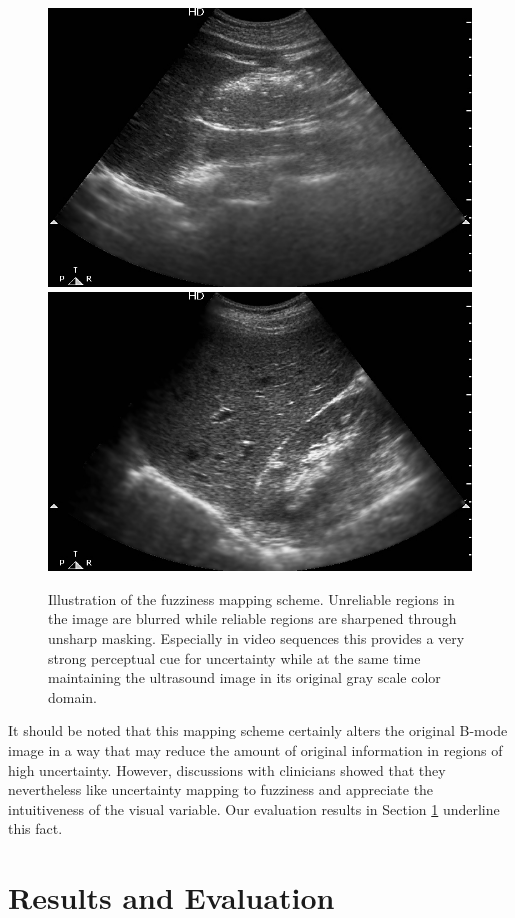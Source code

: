 \begin{figure}[ht]
	\centering
	\includegraphics[width=0.42\linewidth]{figures/cmvis/fuzzy-100.jpg}
	\qquad
	\includegraphics[width=0.42\linewidth]{figures/cmvis/fuzzy-300.jpg}
	\caption{
		Illustration of the fuzziness mapping scheme.
		Unreliable regions in the image are blurred while reliable regions are sharpened through unsharp masking.
		Especially in video sequences this provides a very strong perceptual cue for uncertainty while at the same time maintaining the ultrasound image in its original gray scale color domain.
	}
	\label{fig:cmvis:vis-fuzziness}
\end{figure}

It should be noted that this mapping scheme certainly alters the original B-mode image in a way that may reduce the amount of original information in regions of high uncertainty.
However, discussions with clinicians showed that they nevertheless like uncertainty mapping to fuzziness and appreciate the intuitiveness of the visual variable.
Our evaluation results in Section \ref{sec:cmvis:evaluation} underline this fact.



\section{Results and Evaluation}
\label{sec:cmvis:evaluation}

